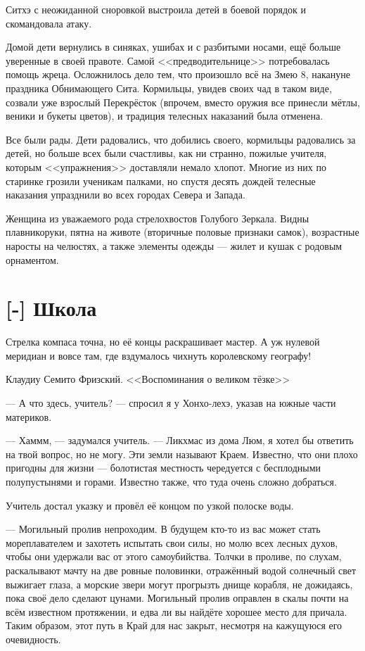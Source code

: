 Ситхэ с неожиданной сноровкой выстроила детей в боевой порядок и скомандовала атаку.

Домой дети вернулись в синяках, ушибах и с разбитыми носами, ещё больше уверенные в своей правоте.
Самой <<предводительнице>> потребовалась помощь жреца.
Осложнилось дело тем, что произошло всё на Змею 8, накануне праздника Обнимающего Сита.
Кормильцы, увидев своих чад в таком виде, созвали уже взрослый Перекрёсток (впрочем, вместо оружия все принесли мётлы, веники и букеты цветов), и традиция телесных наказаний была отменена.

Все были рады.
Дети радовались, что добились своего, кормильцы радовались за детей, но больше всех были счастливы, как ни странно, пожилые учителя, которым <<упражнения>> доставляли немало хлопот.
Многие из них по старинке грозили ученикам палками, но спустя десять дождей телесные наказания упразднили во всех городах Севера и Запада.


\newpage
\thispagestyle{plain}

Женщина из уважаемого рода стрелохвостов Голубого Зеркала.
Видны плавникоруки, пятна на животе (вторичные половые признаки самок), возрастные наросты на челюстях, а также элементы одежды --- жилет и кушак с родовым орнаментом.
\newpage

\section{[-] Школа}

\epigraph
{Стрелка компаса точна, но её концы раскрашивает мастер.
А уж нулевой меридиан и вовсе там, где вздумалось чихнуть королевскому географу!}
{Клаудиу Семито Фризский.
<<Воспоминания о великом тёзке>>}

\textspace

--- А что здесь, учитель? --- спросил я у Хонхо-лехэ, указав на южные части материков.

--- Хаммм, --- задумался учитель.
--- Ликхмас из дома Люм, я хотел бы ответить на твой вопрос, но не могу.
Эти земли называют Краем.
Известно, что они плохо пригодны для жизни --- болотистая местность чередуется с бесплодными полупустынями и горами.
Известно также, что туда очень сложно добраться.

Учитель достал указку и провёл её концом по узкой полоске воды.

--- Могильный пролив непроходим.
В будущем кто-то из вас может стать мореплавателем и захотеть испытать свои силы, но молю всех лесных духов, чтобы они удержали вас от этого самоубийства.
Толчки в проливе, по слухам, раскалывают мачту на две ровные половинки, отражённый водой солнечный свет выжигает глаза, а морские звери могут прогрызть днище корабля, не дожидаясь, пока своё дело сделают цунами.
Могильный пролив оправлен в скалы почти на всём известном протяжении, и едва ли вы найдёте хорошее место для причала.
Таким образом, этот путь в Край для нас закрыт, несмотря на кажущуюся его очевидность.

